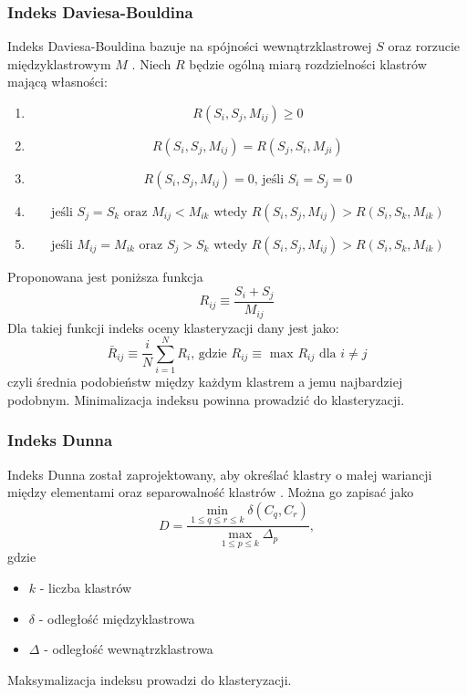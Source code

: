 \subsubsection{Indeks Daviesa-Bouldina}
Indeks Daviesa-Bouldina bazuje na spójności wewnątrzklastrowej $S$ oraz rorzucie międzyklastrowym $M$ \cite{DB79}. Niech $R$ będzie ogólną miarą rozdzielności klastrów mającą własności:
\begin{enumerate}
\item \begin{equation}
R(S_i,S_j,M_{ij}) \geq 0
\end{equation}
\item \begin{equation}
R(S_i,S_j,M_{ij}) = R(S_j,S_i,M_{ji})
\end{equation}
\item \begin{equation}
R(S_i,S_j,M_{ij}) = 0\text{, jeśli } S_i=S_j=0
\end{equation}
\item \begin{equation}
\text{jeśli } S_j=S_k \text{ oraz } M_{ij} < M_{ik} \text{ wtedy } R(S_i,S_j,M_{ij}) > R(S_i,S_k,M_{ik})
\end{equation}
\item \begin{equation}
\text{jeśli } M_{ij} = M_{ik} \text{ oraz } S_j > S_k \text{ wtedy } R(S_i,S_j,M_{ij}) > R(S_i,S_k,M_{ik})
\end{equation}
\end{enumerate}
Proponowana jest poniższa funkcja \cite{DB79}
\begin{equation}
R_{ij} \equiv \frac{S_i + S_j}{M_{ij}}
\end{equation}
Dla takiej funkcji indeks oceny klasteryzacji dany jest jako:
\begin{equation}
\bar{R}_{ij} \equiv \frac{i}{N} \displaystyle \sum_{i=1}^{N} R_i \text{, gdzie } R_{ij} \equiv \text{ max } R_{ij} \text{ dla } i \neq j
\end{equation}
czyli średnia podobieństw między każdym klastrem a jemu najbardziej podobnym. Minimalizacja indeksu powinna prowadzić do  klasteryzacji.

\subsubsection{Indeks Dunna}
Indeks Dunna został zaprojektowany, aby określać klastry o małej wariancji między elementami oraz separowalność klastrów \cite{Dunn73}. Można go zapisać jako
\begin{equation}
D = \frac{\min_{1 \leq q \leq r \leq k} \delta(C_q, C_r) }{\max_{1 \leq p \leq k} \Delta_p},
\end{equation}
gdzie
\begin{itemize}
\item $k$ - liczba klastrów
\item $\delta$ - odległość międzyklastrowa
\item $\Delta$ - odległość wewnątrzklastrowa
\end{itemize}
Maksymalizacja indeksu prowadzi do  klasteryzacji.

